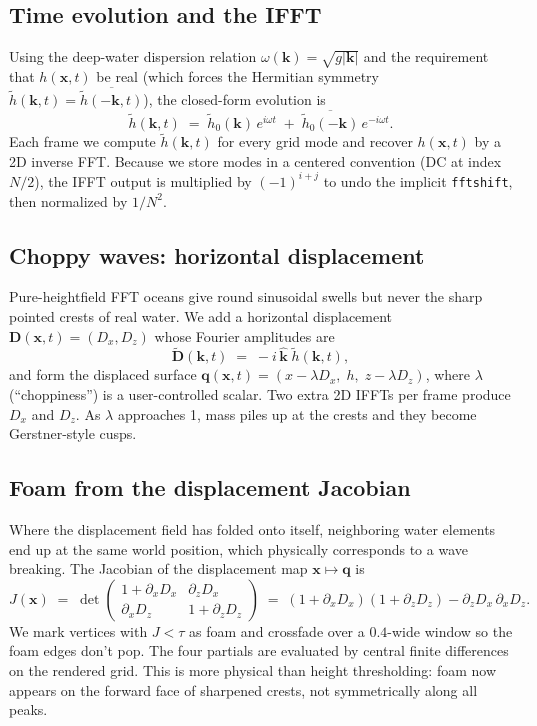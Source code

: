 \documentclass[10pt,letterpaper]{article}
\begin{document}
\subsection{Time evolution and the IFFT}
Using the deep-water dispersion relation
$\omega(\mathbf{k})=\sqrt{g|\mathbf{k}|}$ and the requirement that
$h(\mathbf{x},t)$ be real (which forces the Hermitian symmetry
$\tilde{h}(\mathbf{k},t)=\overline{\tilde h(-\mathbf{k},t)}$), the
closed-form evolution is
\begin{equation}
  \tilde{h}(\mathbf{k},t) \;=\; \tilde{h}_0(\mathbf{k})\,e^{i\omega t}
                              \;+\; \overline{\tilde{h}_0(-\mathbf{k})}\,e^{-i\omega t}.
\end{equation}
Each frame we compute $\tilde{h}(\mathbf{k},t)$ for every grid mode and
recover $h(\mathbf{x},t)$ by a 2D inverse FFT. Because we store modes in a
centered convention (DC at index $N/2$), the IFFT output is multiplied by
$(-1)^{i+j}$ to undo the implicit \texttt{fftshift}, then normalized by
$1/N^2$.

\subsection{Choppy waves: horizontal displacement}
Pure-heightfield FFT oceans give round sinusoidal swells but never the
sharp pointed crests of real water. We add a horizontal displacement
$\mathbf{D}(\mathbf{x},t)=(D_x,D_z)$ whose Fourier amplitudes are
\begin{equation}
  \tilde{\mathbf{D}}(\mathbf{k},t) \;=\; -i\,\hat{\mathbf{k}}\;\tilde{h}(\mathbf{k},t),
\end{equation}
and form the displaced surface
$\mathbf{q}(\mathbf{x},t) = (x - \lambda D_x,\;h,\;z - \lambda D_z)$,
where $\lambda$ (``choppiness'') is a user-controlled scalar. Two extra 2D
IFFTs per frame produce $D_x$ and $D_z$. As $\lambda$ approaches 1, mass
piles up at the crests and they become Gerstner-style cusps.

\subsection{Foam from the displacement Jacobian}
Where the displacement field has folded onto itself, neighboring water
elements end up at the same world position, which physically corresponds to
a wave breaking. The Jacobian of the displacement map
$\mathbf{x}\mapsto\mathbf{q}$ is
\begin{equation}
  J(\mathbf{x}) \;=\; \det\!\begin{pmatrix} 1+\partial_x D_x & \partial_z D_x \\
                                    \partial_x D_z & 1+\partial_z D_z \end{pmatrix}
        \;=\; (1+\partial_x D_x)(1+\partial_z D_z) - \partial_z D_x \,\partial_x D_z.
\end{equation}
We mark vertices with $J<\tau$ as foam and crossfade over a $0.4$-wide
window so the foam edges don't pop. The four partials are evaluated by
central finite differences on the rendered grid. This is more physical than
height thresholding: foam now appears on the forward face of sharpened
crests, not symmetrically along all peaks.
\end{document}
